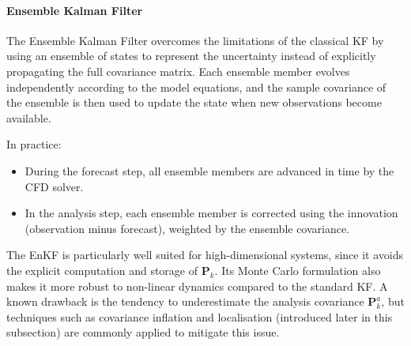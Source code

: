 


\paragraph{Ensemble Kalman Filter}

The Ensemble Kalman Filter overcomes the limitations of the classical \ac{KF} by using an ensemble of states to represent the uncertainty instead of explicitly propagating the full covariance matrix. Each ensemble member evolves independently according to the model equations, and the sample covariance of the ensemble is then used to update the state when new observations become available.

In practice:
\begin{itemize}
    \item During the forecast step, all ensemble members are advanced in time by the CFD solver.
    \item In the analysis step, each ensemble member is corrected using the innovation (observation minus forecast), weighted by the ensemble covariance.
\end{itemize}

The EnKF is particularly well suited for high-dimensional systems, since it avoids the explicit computation and storage of $\mathbf{P}_k$. Its Monte Carlo formulation also makes it more robust to non-linear dynamics compared to the standard KF. A known drawback is the tendency to underestimate the analysis covariance $\mathbf{P}_k^a$, but techniques such as covariance inflation and localisation (introduced later in this subsection) are commonly applied to mitigate this issue.




